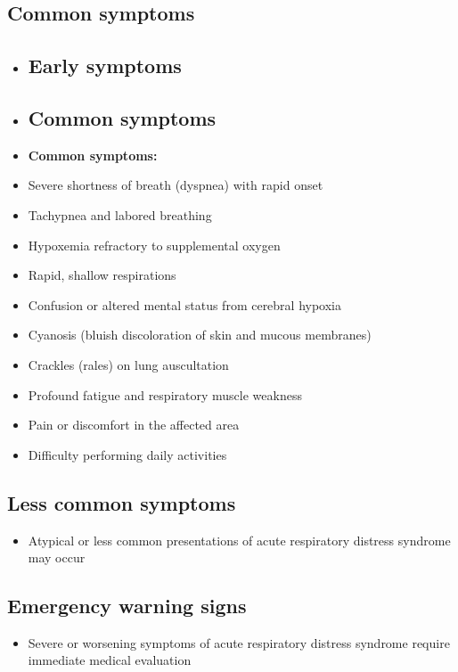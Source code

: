 \subsection{Common symptoms}
\begin{itemize}[noitemsep]
  \item \subsection{Early symptoms}
  \item \subsection{Common symptoms}
  \item \textbf{Common symptoms:}
  \item Severe shortness of breath (dyspnea) with rapid onset
  \item Tachypnea and labored breathing
  \item Hypoxemia refractory to supplemental oxygen
  \item Rapid, shallow respirations
  \item Confusion or altered mental status from cerebral hypoxia
  \item Cyanosis (bluish discoloration of skin and mucous membranes)
  \item Crackles (rales) on lung auscultation
  \item Profound fatigue and respiratory muscle weakness
  \item Pain or discomfort in the affected area
  \item Difficulty performing daily activities
\end{itemize}

\subsection{Less common symptoms}
\begin{itemize}[noitemsep]
  \item Atypical or less common presentations of acute respiratory distress syndrome may occur
\end{itemize}

\subsection{Emergency warning signs}
\begin{itemize}[noitemsep]
  \item Severe or worsening symptoms of acute respiratory distress syndrome require immediate medical evaluation
\end{itemize}
